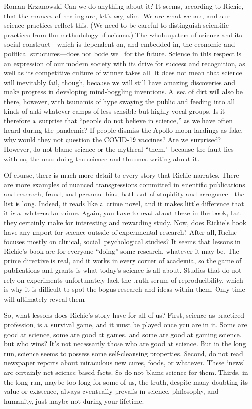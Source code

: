 \begin{newrevengenv}{Roman Krzanowski}
Can we do anything about it? It seems, according to Richie, that the chances of healing are, let's say, slim. We are what we are, and our science practices reflect this. (We need to be careful to distinguish scientific practices from the methodology of science.) The whole system of science and its social construct—which is dependent on, and embedded in, the economic and political structures—does not bode well for the future. Science in this respect is an expression of our modern society with its drive for success and recognition, as well as its competitive culture of winner takes all. It does not mean that science will inevitably fail, though, because we will still have amazing discoveries and make progress in developing mind-boggling inventions. A~sea of dirt will also be there, however, with tsunamis of hype swaying the public and feeding into all kinds of anti-whatever camps of less sensible but highly vocal groups. Is it therefore a~surprise that ``people do not believe in science,'' as we have often heard during the pandemic? If people dismiss the Apollo moon landings as fake, why would they not question the COVID-19 vaccines? Are we surprised? However, do not blame science or the mythical ``them,'' because the fault lies with us, the ones doing the science and the ones writing about it.

Of course, there is much more detail to every story that Richie narrates. There are more examples of nuanced transgressions committed in scientific publications and research, fraud, and personal bias, both out of stupidity and arrogance—the list is long. Indeed, it reads like a~crime novel, and it makes little difference that it is a~white-collar crime. Again, you have to read about these in the book, but they certainly make for interesting and rewarding study. Now, does Richie's book have any import for science outside of experimental research? After all, Richie focuses mostly on clinical, social, psychological studies? It seems that lessons in Richie's book are for everyone ``doing'' some research, whatever it may be. The prime directive is real, and it works in every corner of academia, so the game of publications and grants is what today's science is all about. Studies that do not rely on experiments unfortunately lack the truth serum of reproducibility, which is why it is difficult to spot the bogus research and ideas within them. Only time will ultimately reveal them.

So, what lessons does Richie's story have for all of us? First, science as practiced profession, is a~survival game, and it must be played once you are in it. Some are good at science, some are good at games, and some are good at gaming science, but who wins? It's not necessarily those who are good at science. But in the long run, science seems to possess some self-cleansing properties. Second, do not read newspaper reports about miraculous new cures, foods, or whatever. These ‘news' are certainly not science-based facts. So do not blame science for them. Thirds, in the long run, maybe too long for some of us, the truth, despite many doubting its value or existence, always eventually prevails in science, philosophy, and humanity, just maybe not during your lifetime.


\end{newrevengenv}

